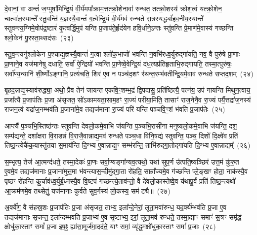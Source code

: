{%
दे॒वानां॒ वा अन्तं॑ ज॒ग्मुषा॑मिन्द्रि॒यं वी॒र्य॑मपा᳚क्राम॒त्तत्क्रो॒शेनावा॑ रुन्धत॒ तत्क्रो॒शस्य॑ क्रोश॒त्वं यत्क्रो॒शेन॒ चात्वा॑ल॒स्यान्ते᳚ स्तु॒वन्ति॑ य॒ज्ञस्यै॒वान्तं॑ ग॒त्वेन्द्रि॒यं वी॒र्य॑मव॑ रुन्धते स॒त्रस्यर्द्ध्या॑हव॒नीय॒स्यान्ते᳚ स्तुवन्त्य॒ग्निमे॒वोप॑द्र॒ष्टारं॑ कृ॒त्वर्द्धि॒मुप॑ यन्ति प्र॒जाप॑ते॒र्\mbox{}हृद॑येन हवि॒र्धाने॒\-ऽन्तः स्तु॑वन्ति प्रे॒माण॑मे॒वास्य॑ गच्छन्ति श्लो॒केन॑ पु॒रस्ता॒थ्सद॑सः~(२३)

स्तु॒व॒न्त्यनु॑श्लोकेन प॒श्चाद्य॒ज्ञस्यै॒वान्तं॑ ग॒त्वा श्लो॑क॒भाजो॑ भवन्ति न॒वभि॑रध्व॒र्युरुद्गा॑यति॒ नव॒ वै पुरु॑षे प्रा॒णाः प्रा॒णाने॒व यज॑मानेषु दधाति॒ सर्वा॑ ऐ॒न्द्रियो॑ भवन्ति प्रा॒णेष्वे॒वेन्द्रि॒यं द॑ध॒त्यप्र॑तिहृताभि॒रुद्गा॑यति॒ तस्मा॒त्पुरु॑षः॒ सर्वा᳚ण्य॒न्यानि॑ शी॒र्ष्णो\-ऽङ्गा॑नि॒ प्रत्य॑चति॒ शिर॑ ए॒व न पञ्च॑द॒शꣳ र॑थन्त॒रम्भ॑वतीन्द्रि॒यमे॒वाव॑ रुन्धते सप्तद॒शम्~(२४)

बृ॒हद॒न्नाद्य॒स्याव॑रुद्ध्या॒ अथो॒ प्रैव तेन॑ जायन्त एकवि॒ꣳ॒शम्भ॒द्रं द्वि॒पदा॑सु॒ प्रति॑ष्ठित्यै॒ पत्न॑य॒ उप॑ गायन्ति मिथुन॒त्वाय॒ प्रजा᳚त्यै प्र॒जा\-प॑तिः प्र॒जा अ॑सृजत॒ सो॑\-ऽकामयता॒साम॒हꣳ रा॒ज्यं परी॑या॒मिति॒ तासाꣳ॑ राज॒नेनै॒व रा॒ज्यं पर्यै॒त्तद्रा॑ज॒नस्य॑ राजन॒त्वं यद्रा॑ज॒नम्भव॑ति प्र॒जाना॑मे॒व तद्यज॑माना रा॒ज्यं परि॑ यन्ति पञ्चवि॒ꣳ॒शं भ॑वति प्र॒जाप॑तेः~(२५)

आप्त्यै॑ प॒ञ्चभि॒स्तिष्ठ॑न्तः स्तुवन्ति देवलो॒कमे॒वाभि ज॑यन्ति प॒ञ्चभि॒रासी॑ना मनुष्यलो॒कमे॒वाभि ज॑यन्ति॒ दश॒ सम्प॑द्यन्ते॒ दशा᳚क्षरा वि॒राडन्नं॑ वि॒राजै॒वान्नाद्य॒मव॑ रुन्धते पञ्च॒धा वि॑नि॒षद्य॑ स्तुवन्ति॒ पञ्च॒ दिशो॑ दि॒क्ष्वे॑व प्रति॑ तिष्ठ॒न्त्येकै॑क॒यास्तु॑तया स॒माय॑न्ति दि॒ग्भ्य ए॒वान्नाद्य॒ꣳ॒ सम्भ॑रन्ति॒ ताभि॑रुद्गा॒तोद्गा॑यति दि॒ग्भ्य ए॒वान्नाद्यम्᳚~(२६)

स॒म्भृत्य॒ तेज॑ आ॒त्मन्द॑धते॒ तस्मा॒देकः॑ प्रा॒णः सर्वा॒ण्यङ्गा᳚न्यव॒त्यथो॒ यथा॑ सुप॒र्ण उ॑त्पति॒ष्यञ्छिर॑ उत्त॒मं कु॑रु॒त ए॒वमे॒व तद्यज॑मानाः प्र॒जाना॑मुत्त॒मा भ॑वन्त्यास॒न्दीमु॑द्गा॒ता रो॑हति॒ साम्रा᳚ज्यमे॒व ग॑च्छन्ति प्ले॒ङ्खꣳ होता॒ नाक॑स्यै॒व पृ॒ष्ठꣳ रो॑हन्ति कू॒र्चाव॑ध्व॒र्युर्ब्र॒ध्नस्यै॒व वि॒ष्टपं॑ गच्छन्त्ये॒ताव॑न्तो॒ वै दे॑वलो॒कास्तेष्वे॒व य॑थापू॒र्वं प्रति॑ तिष्ठ॒न्त्यथो॑ आ॒क्रम॑णमे॒व तथ्सेतुं॒ यज॑मानाः कुर्वते सुव॒र्गस्य॑ लो॒कस्य॒ सम॑ट्यै॥~(२७)

{\anuvakamend[{सद॑सः सप्तद॒शं प्र॒जाप॑तेर्गायति दि॒ग्भ्य ए॒वान्नाद्य॒म्प्रत्येका॑\-दश च}]}%

अ॒र्क्ये॑ण॒ वै स॑हस्र॒शः प्र॒जा\-प॑तिः प्र॒जा अ॑सृजत॒ ताभ्य॒ इला᳚न्दे॒नेरां॒ लूता॒मवा॑रुन्ध॒ यद॒र्क्य॑म्भव॑ति प्र॒जा ए॒व तद्यज॑मानाः सृजन्त॒ इला᳚न्दम्भवति प्र॒जाभ्य॑ ए॒व सृ॒ष्टाभ्य॒ इरां॒ लूता॒मव॑ रुन्धते॒ तस्मा॒द्याꣳ समाꣳ॑ स॒त्रꣳ समृ॑द्धं॒ क्षोधु॑का॒स्ताꣳ समां᳚ प्र॒जा इष॒ꣴ॒ ह्या॑सा॒मूर्ज॑मा॒दद॑ते॒ याꣳ समां॒ व्यृ॑द्ध॒मक्षो॑धुका॒स्ताꣳ समां᳚ प्र॒जाः~(२८)

}
